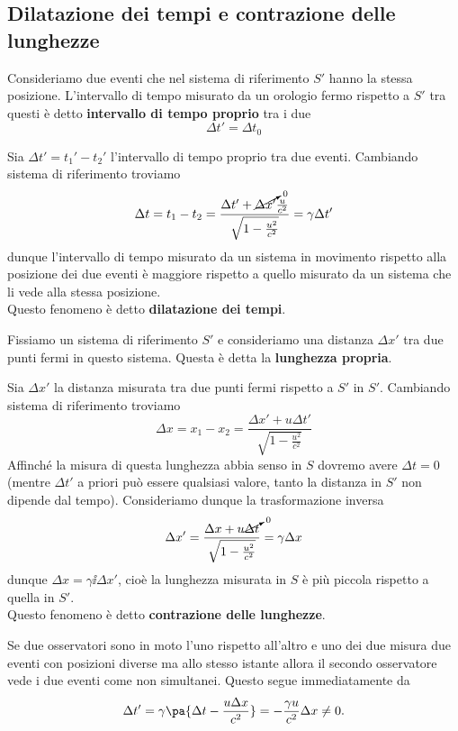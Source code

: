 \subsection{Dilatazione dei tempi e contrazione delle lunghezze}
\begin{definition}
Consideriamo due eventi che nel sistema di riferimento $S'$ hanno la stessa posizione. L'intervallo di tempo misurato da un orologio fermo rispetto a $S'$ tra questi \`e detto \textbf{intervallo di tempo proprio} tra i due
\[\Delta t'=\Delta t_0\]
\end{definition}

\noindent
Sia $\Delta t'=t_1'-t_2'$ l'intervallo di tempo proprio tra due eventi. Cambiando sistema di riferimento troviamo
\[\Delta t=t_1-t_2=\frac{\Delta t'+\cancelto0{\Delta x'} \frac{u}{c^2}}{\sqrt{1-\frac {u^2}{c^2}}}=\gamma \Delta t'\]
dunque l'intervallo di tempo misurato da un sistema in movimento rispetto alla posizione dei due eventi \`e maggiore rispetto a quello misurato da un sistema che li vede alla stessa posizione.\\
Questo fenomeno \`e detto \textbf{dilatazione dei tempi}.
\bigskip


\begin{definition}
Fissiamo un sistema di riferimento $S'$ e consideriamo una distanza $\Delta x'$ tra due punti fermi in questo sistema. Questa \`e detta la \textbf{lunghezza propria}.
\end{definition}
Sia $\Delta x'$ la distanza misurata tra due punti fermi rispetto a $S'$ in $S'$. Cambiando sistema di riferimento troviamo
\[\Delta x=x_1-x_2=\frac{\Delta x'+u\Delta t'}{\sqrt{1-\frac{u^2}{c^2}}}\]
Affinch\'e la misura di questa lunghezza abbia senso in $S$ dovremo avere $\Delta t=0$ (mentre $\Delta t'$ a priori pu\`o essere qualsiasi valore, tanto la distanza in $S'$ non dipende dal tempo). Consideriamo dunque la trasformazione inversa
\[\Delta x'=\frac{\Delta x+u\cancelto0{\Delta t}}{\sqrt{1-\frac{u^2}{c^2}}}=\gamma \Delta x\]
dunque $\Delta x=\gamma\ii \Delta x'$, cio\`e la lunghezza misurata in $S$ \`e pi\`u piccola rispetto a quella in $S'$.\\
Questo fenomeno \`e detto \textbf{contrazione delle lunghezze}.

\begin{example}
Se due osservatori sono in moto l'uno rispetto all'altro e uno dei due misura due eventi con posizioni diverse ma allo stesso istante allora il secondo osservatore vede i due eventi come non simultanei. Questo segue immediatamente da
\[\Delta t'=\gamma\pa{\Delta t-\frac{u\Delta x}{c^2}}=-\frac{\gamma u}{c^2} \Delta x\neq 0.\]
\end{example}




